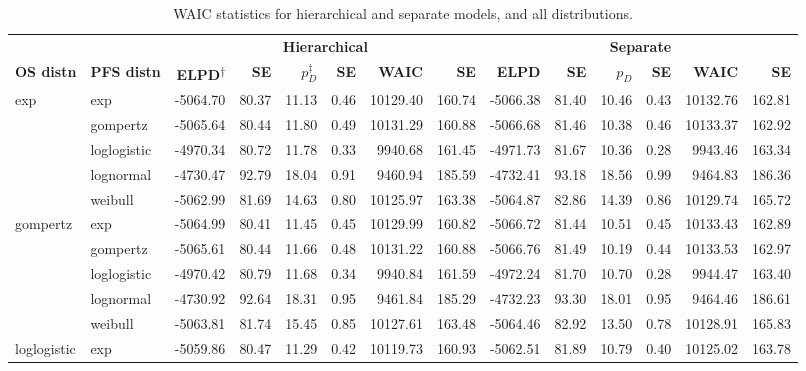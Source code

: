 \documentclass[AMA,STIX1COL]{WileyNJD-v2}
\begin{document}
\begin{center}
\begin{table}[t]
\caption{WAIC statistics for hierarchical and separate models, and all distributions. \label{tab:waic}}
\begin{tabular}{llrrrrrrrrrrrr}
\toprule
\multicolumn{1}{l}{} & \multicolumn{1}{l}{} & \multicolumn{6}{c}{\textbf{Hierarchical}} & \multicolumn{6}{c}{\textbf{Separate}}\\
\cmidrule{3-8}\cmidrule{5-6}\cmidrule{9-14}
\textbf{OS distn} & \textbf{PFS distn} & \textbf{ELPD\textsuperscript{$\dagger$}} & \textbf{SE} & \textbf{$p_D^{\ddagger}$} & \textbf{SE} & \textbf{WAIC} & \textbf{SE} & \textbf{ELPD} & \textbf{SE} & $p_D$ & \textbf{SE} & \textbf{WAIC} & \textbf{SE}\\
\midrule
exp & exp & -5064.70 & 80.37 & 11.13 & 0.46 & 10129.40 & 160.74 & -5066.38 & 81.40 & 10.46 & 0.43 & 10132.76 & 162.81\\
 & gompertz & -5065.64 & 80.44 & 11.80 & 0.49 & 10131.29 & 160.88 & -5066.68 & 81.46 & 10.38 & 0.46 & 10133.37 & 162.92\\
 & loglogistic & -4970.34 & 80.72 & 11.78 & 0.33 & 9940.68 & 161.45 & -4971.73 & 81.67 & 10.36 & 0.28 & 9943.46 & 163.34\\
 & lognormal & -4730.47 & 92.79 & 18.04 & 0.91 & 9460.94 & 185.59 & -4732.41 & 93.18 & 18.56 & 0.99 & 9464.83 & 186.36\\
 & weibull & -5062.99 & 81.69 & 14.63 & 0.80 & 10125.97 & 163.38 & -5064.87 & 82.86 & 14.39 & 0.86 & 10129.74 & 165.72\\
gompertz & exp & -5064.99 & 80.41 & 11.45 & 0.45 & 10129.99 & 160.82 & -5066.72 & 81.44 & 10.51 & 0.45 & 10133.43 & 162.89\\
 & gompertz & -5065.61 & 80.44 & 11.66 & 0.48 & 10131.22 & 160.88 & -5066.76 & 81.49 & 10.19 & 0.44 & 10133.53 & 162.97\\
 & loglogistic & -4970.42 & 80.79 & 11.68 & 0.34 & 9940.84 & 161.59 & -4972.24 & 81.70 & 10.70 & 0.28 & 9944.47 & 163.40\\
 & lognormal & -4730.92 & 92.64 & 18.31 & 0.95 & 9461.84 & 185.29 & -4732.23 & 93.30 & 18.01 & 0.95 & 9464.46 & 186.61\\
 & weibull & -5063.81 & 81.74 & 15.45 & 0.85 & 10127.61 & 163.48 & -5064.46 & 82.92 & 13.50 & 0.78 & 10128.91 & 165.83\\
loglogistic & exp & -5059.86 & 80.47 & 11.29 & 0.42 & 10119.73 & 160.93 & -5062.51 & 81.89 & 10.79 & 0.40 & 10125.02 & 163.78\\

\end{tabular}
\end{table}
\end{center}
\end{document}
